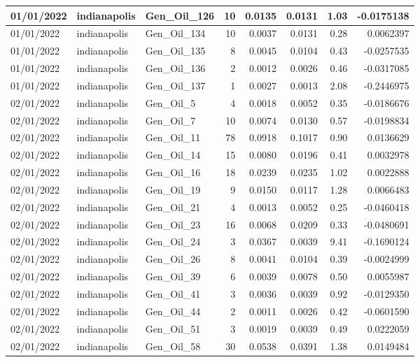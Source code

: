 \documentclass[
  letterpaper,
  DIV=11,
  numbers=noendperiod]{scrartcl}
\begin{document}
\begin{tabular}{l|l|l|r|r|r|r|r}
\hline
01/01/2022 & indianapolis & Gen\_Oil\_126 & 10 & 0.0135 & 0.0131 & 1.03 & -0.0175138\\
\hline
01/01/2022 & indianapolis & Gen\_Oil\_134 & 10 & 0.0037 & 0.0131 & 0.28 & 0.0062397\\
\hline
01/01/2022 & indianapolis & Gen\_Oil\_135 & 8 & 0.0045 & 0.0104 & 0.43 & -0.0257535\\
\hline
01/01/2022 & indianapolis & Gen\_Oil\_136 & 2 & 0.0012 & 0.0026 & 0.46 & -0.0317085\\
\hline
01/01/2022 & indianapolis & Gen\_Oil\_137 & 1 & 0.0027 & 0.0013 & 2.08 & -0.2446975\\
\hline
02/01/2022 & indianapolis & Gen\_Oil\_5 & 4 & 0.0018 & 0.0052 & 0.35 & -0.0186676\\
\hline
02/01/2022 & indianapolis & Gen\_Oil\_7 & 10 & 0.0074 & 0.0130 & 0.57 & -0.0198834\\
\hline
02/01/2022 & indianapolis & Gen\_Oil\_11 & 78 & 0.0918 & 0.1017 & 0.90 & 0.0136629\\
\hline
02/01/2022 & indianapolis & Gen\_Oil\_14 & 15 & 0.0080 & 0.0196 & 0.41 & 0.0032978\\
\hline
02/01/2022 & indianapolis & Gen\_Oil\_16 & 18 & 0.0239 & 0.0235 & 1.02 & 0.0022888\\
\hline
02/01/2022 & indianapolis & Gen\_Oil\_19 & 9 & 0.0150 & 0.0117 & 1.28 & 0.0066483\\
\hline
02/01/2022 & indianapolis & Gen\_Oil\_21 & 4 & 0.0013 & 0.0052 & 0.25 & -0.0460418\\
\hline
02/01/2022 & indianapolis & Gen\_Oil\_23 & 16 & 0.0068 & 0.0209 & 0.33 & -0.0480691\\
\hline
02/01/2022 & indianapolis & Gen\_Oil\_24 & 3 & 0.0367 & 0.0039 & 9.41 & -0.1690124\\
\hline
02/01/2022 & indianapolis & Gen\_Oil\_26 & 8 & 0.0041 & 0.0104 & 0.39 & -0.0024999\\
\hline
02/01/2022 & indianapolis & Gen\_Oil\_39 & 6 & 0.0039 & 0.0078 & 0.50 & 0.0055987\\
\hline
02/01/2022 & indianapolis & Gen\_Oil\_41 & 3 & 0.0036 & 0.0039 & 0.92 & -0.0129350\\
\hline
02/01/2022 & indianapolis & Gen\_Oil\_44 & 2 & 0.0011 & 0.0026 & 0.42 & -0.0601590\\
\hline
02/01/2022 & indianapolis & Gen\_Oil\_51 & 3 & 0.0019 & 0.0039 & 0.49 & 0.0222059\\
\hline
02/01/2022 & indianapolis & Gen\_Oil\_58 & 30 & 0.0538 & 0.0391 & 1.38 & 0.0149484\\

\end{tabular}
\end{document}
